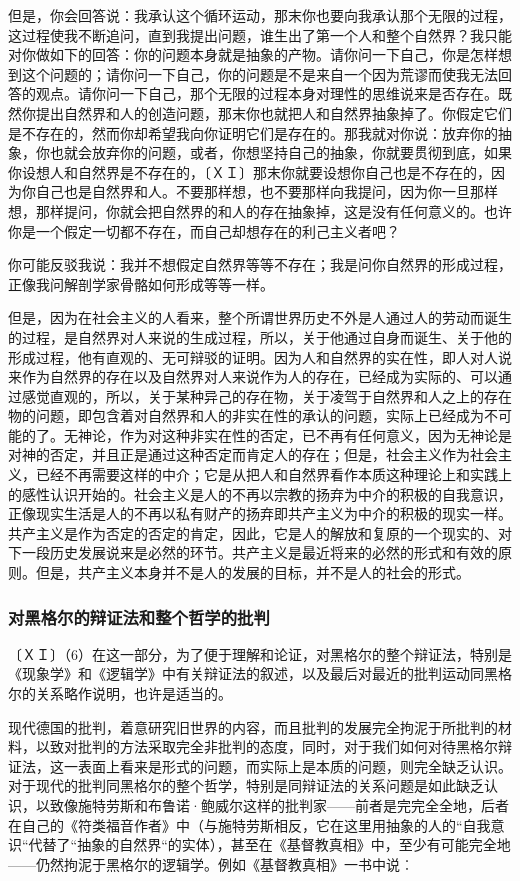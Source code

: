 \documentclass[a4paper,twoside,12pt,AutoFakeBold]{ctexart}
\begin{document}
但是，你会回答说：我承认这个循环运动，那末你也要向我承认那个无限的过程，这过程使我不断追问，直到我提出问题，谁生出了第一个人和整个自然界？我只能对你做如下的回答：你的问题本身就是抽象的产物。请你问一下自己，你是怎样想到这个问题的；请你问一下自己，你的问题是不是来自一个因为荒谬而使我无法回答的观点。请你问一下自己，那个无限的过程本身对理性的思维说来是否存在。既然你提出自然界和人的创造问题，那末你也就把人和自然界抽象掉了。你假定它们是不存在的，然而你却希望我向你证明它们是存在的。那我就对你说：放弃你的抽象，你也就会放弃你的问题，或者，你想坚持自己的抽象，你就要贯彻到底，如果你设想人和自然界是不存在的，〔ＸＩ〕那末你就要设想你自己也是不存在的，因为你自己也是自然界和人。不要那样想，也不要那样向我提问，因为你一旦那样想，那样提问，你就会把自然界的和人的存在抽象掉，这是没有任何意义的。也许你是一个假定一切都不存在，而自己却想存在的利己主义者吧？

你可能反驳我说：我并不想假定自然界等等不存在；我是问你自然界的形成过程，正像我问解剖学家骨骼如何形成等等一样。

但是，因为在社会主义的人看来，整个所谓世界历史不外是人通过人的劳动而诞生的过程，是自然界对人来说的生成过程，所以，关于他通过自身而诞生、关于他的形成过程，他有直观的、无可辩驳的证明。因为人和自然界的实在性，即人对人说来作为自然界的存在以及自然界对人来说作为人的存在，已经成为实际的、可以通过感觉直观的，所以，关于某种异己的存在物，关于凌驾于自然界和人之上的存在物的问题，即包含着对自然界和人的非实在性的承认的问题，实际上已经成为不可能的了。无神论，作为对这种非实在性的否定，已不再有任何意义，因为无神论是对神的否定，并且正是通过这种否定而肯定人的存在；但是，社会主义作为社会主义，已经不再需要这样的中介；它是从把人和自然界看作本质这种理论上和实践上的感性认识开始的。社会主义是人的不再以宗教的扬弃为中介的积极的自我意识，正像现实生活是人的不再以私有财产的扬弃即共产主义为中介的积极的现实一样。共产主义是作为否定的否定的肯定，因此，它是人的解放和复原的一个现实的、对下一段历史发展说来是必然的环节。共产主义是最近将来的必然的形式和有效的原则。但是，共产主义本身并不是人的发展的目标，并不是人的社会的形式。

\subsubsection{对黑格尔的辩证法和整个哲学的批判}
〔ＸＩ〕（6）在这一部分，为了便于理解和论证，对黑格尔的整个辩证法，特别是《现象学》和《逻辑学》中有关辩证法的叙述，以及最后对最近的批判运动同黑格尔的关系略作说明，也许是适当的。

现代德国的批判，着意研究旧世界的内容，而且批判的发展完全拘泥于所批判的材料，以致对批判的方法采取完全非批判的态度，同时，对于我们如何对待黑格尔辩证法，这一表面上看来是形式的问题，而实际上是本质的问题，则完全缺乏认识。对于现代的批判同黑格尔的整个哲学，特别是同辩证法的关系问题是如此缺乏认识，以致像施特劳斯和布鲁诺·鲍威尔这样的批判家——前者是完完全全地，后者在自己的《符类福音作者》中（与施特劳斯相反，它在这里用抽象的人的“自我意识“代替了“抽象的自然界“的实体），甚至在《基督教真相》中，至少有可能完全地——仍然拘泥于黑格尔的逻辑学。例如《基督教真相》一书中说︰
\end{document}
